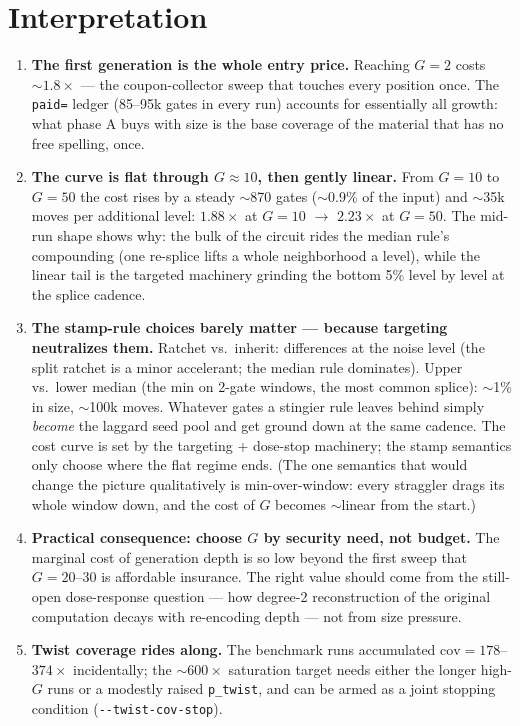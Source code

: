 \documentclass[11pt]{article}
\newcommand{\code}[1]{\texttt{#1}}
\begin{document}
\section{Interpretation}
\begin{enumerate}
\item \textbf{The first generation is the whole entry price.} Reaching
$G=2$ costs $\sim 1.8\times$ --- the coupon-collector sweep that touches
every position once. The \code{paid=} ledger (85--95k gates in every run)
accounts for essentially all growth: what phase A buys with size is the
base coverage of the material that has no free spelling, once.
\item \textbf{The curve is flat through $G\approx 10$, then gently
linear.} From $G=10$ to $G=50$ the cost rises by a steady $\sim$870 gates
($\sim$0.9\% of the input) and $\sim$35k moves per additional level:
$1.88\times$ at $G=10$ $\to$ $2.23\times$ at $G=50$. The mid-run shape
shows why: the bulk of the circuit rides the median rule's compounding (one
re-splice lifts a whole neighborhood a level), while the linear tail is the
targeted machinery grinding the bottom 5\% level by level at the splice
cadence.
\item \textbf{The stamp-rule choices barely matter --- because targeting
neutralizes them.} Ratchet vs.\ inherit: differences at the noise level
(the split ratchet is a minor accelerant; the median rule dominates). Upper
vs.\ lower median (the min on 2-gate windows, the most common splice):
$\sim$1\% in size, $\sim$100k moves. Whatever gates a stingier rule leaves
behind simply \emph{become} the laggard seed pool and get ground down at
the same cadence. The cost curve is set by the targeting + dose-stop
machinery; the stamp semantics only choose where the flat regime ends.
(The one semantics that would change the picture qualitatively is
min-over-window: every straggler drags its whole window down, and the cost
of $G$ becomes $\sim$linear from the start.)
\item \textbf{Practical consequence: choose $G$ by security need, not
budget.} The marginal cost of generation depth is so low beyond the first
sweep that $G=20$--$30$ is affordable insurance. The right value should
come from the still-open dose-response question --- how degree-2
reconstruction of the original computation decays with re-encoding depth
--- not from size pressure.
\item \textbf{Twist coverage rides along.} The benchmark runs accumulated
$\mathrm{cov}=178$--$374\times$ incidentally; the $\sim 600\times$
saturation target needs either the longer high-$G$ runs or a modestly
raised \code{p\_twist}, and can be armed as a joint stopping condition
(\code{-{}-twist-cov-stop}).
\end{enumerate}
\end{document}
